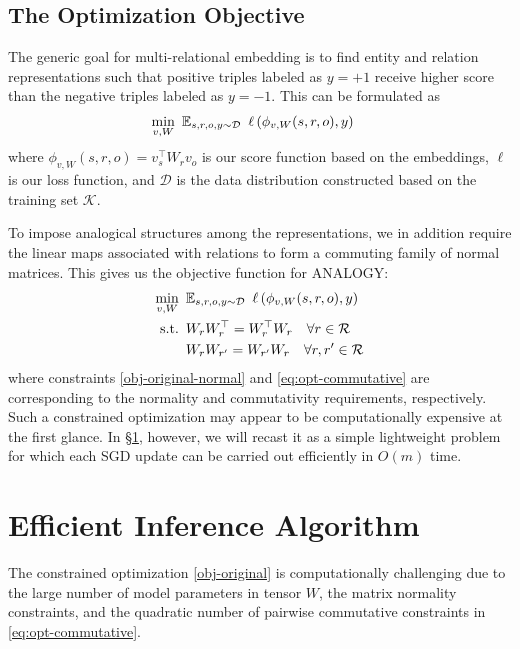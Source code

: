 \documentclass{article}
\begin{document}
\subsection{The Optimization Objective}
The generic goal for multi-relational embedding
is to find entity and relation representations 
such that positive triples labeled as $y=+1$ receive higher score than the negative triples labeled as $y=-1$.
This can be formulated as
\begin{align}
    \min_{v, W} \enskip& \mathbb{E}_{s,r,o,y \sim \mathcal{D}}\enskip \ell\left(\phi_{v, W}( s, r, o ), y\right)
\end{align}
where $\phi_{v, W}(s, r, o) = v_s^\top W_r v_o$ is our score function based on the embeddings,
$\ell$ is our loss function,
and $\mathcal{D}$ is the data distribution constructed based on the training set $\mathcal{K}$.

To impose analogical structures among the representations,
we in addition require the linear maps associated with relations
to form a commuting family of normal matrices.
This gives us the objective function for ANALOGY:
\begin{align}
    \min_{v, W} \enskip &\mathbb{E}_{s,r,o,y \sim \mathcal{D}}\enskip \ell\left(\phi_{v, W}( s, r, o ), y\right) \label{obj-original} \\
    \text{s.t.} \enskip& W_r W_r^\top = W_r^\top W_r \quad \forall r \in \mathcal{R} \label{obj-original-normal} \\
    \enskip & W_rW_{r'} = W_{r'}W_r \quad \forall r, r' \in \mathcal{R} \label{eq:opt-commutative}
\end{align}
where constraints \eqref{obj-original-normal} and \eqref{eq:opt-commutative} are corresponding to the normality and commutativity requirements,
respectively.
Such a constrained optimization may appear to be computationally expensive at the first glance.
In \S \ref{sec:algorithm}, however, we will recast it as a simple lightweight problem
for which each SGD update can be carried out efficiently in $O(m)$ time.

 \section{Efficient Inference Algorithm}
\label{sec:algorithm}

The constrained optimization \eqref{obj-original}
is computationally challenging due to the large number of model parameters in tensor $W$,
the matrix normality constraints,
and the quadratic number of pairwise commutative constraints in \eqref{eq:opt-commutative}.
\end{document}
